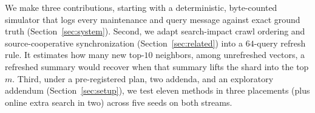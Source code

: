 We make three contributions, starting with a deterministic, byte-counted simulator that logs every maintenance and query message against exact ground truth (Section~\ref{sec:system}). Second, we adapt search-impact crawl ordering and source-cooperative synchronization (Section~\ref{sec:related}) into a $64$-query refresh rule. It estimates how many new top-$10$ neighbors, among unrefreshed vectors, a refreshed summary would recover when that summary lifts the shard into the top $m$. Third, under a pre-registered plan, two addenda, and an exploratory addendum (Section~\ref{sec:setup}), we test eleven methods in three placements (plus online extra search in two) across five seeds on both streams.
